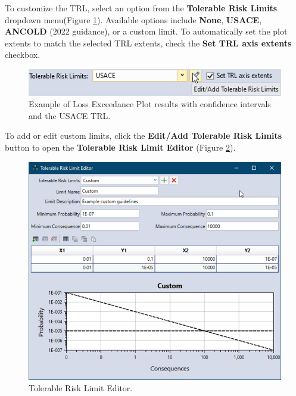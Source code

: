 \documentclass[
]{book}
\begin{document}
To customize the TRL, select an option from the \textbf{Tolerable Risk Limits} dropdown menu(Figure \ref{fig:figure-139}). Available options include \textbf{None}, \textbf{USACE}, \textbf{ANCOLD} (2022 guidance), or a custom limit. To automatically set the plot extents to match the selected TRL extents, check the \textbf{Set TRL axis extents} checkbox.

\begin{figure}

{\centering \includegraphics{images/figure139} 

}

\caption{Example of Loss Exceedance Plot results with confidence intervals and the USACE TRL.}\label{fig:figure-139}
\end{figure}

To add or edit custom limits, click the \textbf{Edit/Add Tolerable Risk Limits} button to open the \textbf{Tolerable Risk Limit Editor} (Figure \ref{fig:figure-140}).

\begin{figure}

{\centering \includegraphics{images/figure140} 

}

\caption{Tolerable Risk Limit Editor.}\label{fig:figure-140}
\end{figure}
\end{document}
